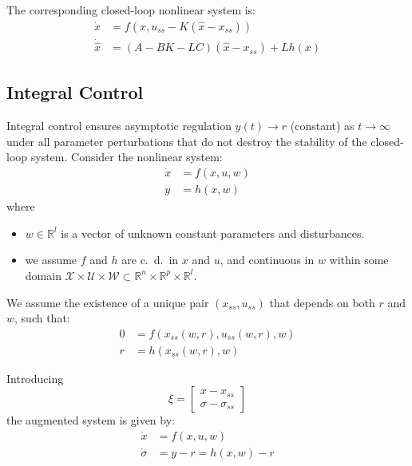 \newpar{}

The corresponding closed-loop nonlinear system is:
\begin{align*}
    \dot{x}       & = f(x, u_{ss} - K(\hat{x} - x_{ss}))       \\
    \dot{\hat{x}} & = (A - BK - LC)(\hat{x} - x_{ss}) + L h(x)
\end{align*}

\subsection{Integral Control}
Integral control ensures asymptotic regulation $y(t) \to r$ (constant) as $t \to \infty$ under all parameter perturbations that do not destroy the stability of the closed-loop system.
\newpar{}
Consider the nonlinear system:
\begin{align*}
    \dot{x} & = f(x, u, w) \\
    y       & = h(x, w)
\end{align*}
where
\begin{itemize}
    \item $w \in \mathbb{R}^{l}$ is a vector of unknown constant parameters and disturbances.
    \item we assume $f$ and $h$ are c.\ d.\ in $x$ and $u$, and continuous in $w$ within some domain $\mathcal{X} \times \mathcal{U} \times \mathcal{W} \subset \mathbb{R}^{n} \times \mathbb{R}^{p} \times \mathbb{R}^{l}$.
\end{itemize}

\newpar{}

\newpar{}
\ptitle{}
We assume the existence of a unique pair $(x_{ss}, u_{ss})$ that depends on both $r$ and $w$, such that:
\begin{align*}
    0 & = f(x_{ss}(w, r), u_{ss}(w, r), w) \\
    r & = h(x_{ss}(w, r), w)
\end{align*}

\newpar{}

Introducing
\begin{equation*}
    \xi = \begin{bmatrix} x - x_{ss} \\ \sigma - \sigma_{ss} \end{bmatrix}
\end{equation*}
the augmented system is given by:
\begin{align*}
    \dot{x}      & = f(x, u, w)        \\
    \dot{\sigma} & = y-r = h(x, w) - r
\end{align*}


